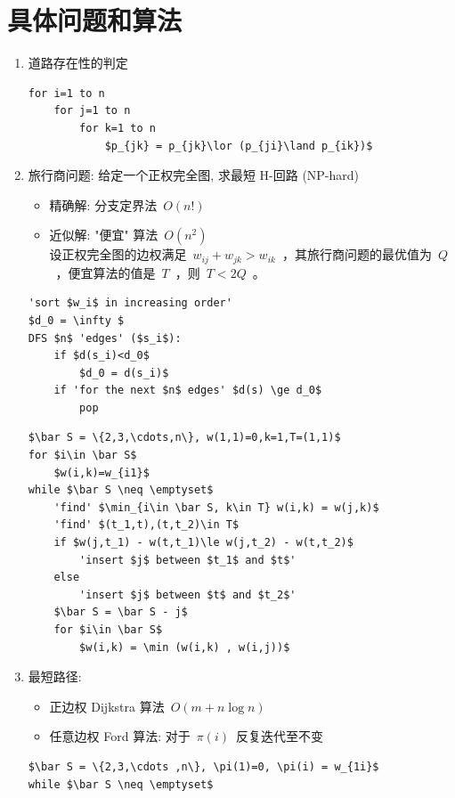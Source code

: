 \documentclass[11pt,a4paper]{article}%
\renewcommand{\[}{~$}
\renewcommand{\]}{$~}%
\begin{document}
\section{具体问题和算法}
	\begin{enumerate}
	 \item 道路存在性的判定
	 	 \begin{lstlisting}[mathescape,frame=shadowbox, caption=道路存在性的 Warshall 算法]
for i=1 to n
	for j=1 to n
		for k=1 to n
			$p_{jk} = p_{jk}\lor (p_{ji}\land p_{ik})$
	 	\end{lstlisting}
	 \item 旅行商问题: 给定一个正权完全图, 求最短 H-回路 (NP-hard)
	  \begin{itemize}
	   \item 精确解: 分支定界法\[O(n!)\]
	   \item 近似解: "便宜" 算法\[O(n^2)\]\\
	   	设正权完全图的边权满足\[w_{ij} + w_{jk}> w_{ik}\]，其旅行商问题的最优值为\[Q\]，便宜算法的值是\[T\]，则\[T<2Q\]。
	  \end{itemize}
	  \begin{lstlisting}[mathescape,frame=shadowbox, caption=旅行商问题的分支定界法]
'sort $w_i$ in increasing order'
$d_0 = \infty $
DFS $n$ 'edges' ($s_i$):
	if $d(s_i)<d_0$
		$d_0 = d(s_i)$
	if 'for the next $n$ edges' $d(s) \ge d_0$
		pop
	 	\end{lstlisting}
	   	\begin{lstlisting}[mathescape,frame=shadowbox, caption=旅行商问题的便宜算法]
$\bar S = \{2,3,\cdots,n\}, w(1,1)=0,k=1,T=(1,1)$
for $i\in \bar S$
	$w(i,k)=w_{i1}$
while $\bar S \neq \emptyset$
	'find' $\min_{i\in \bar S, k\in T} w(i,k) = w(j,k)$
	'find' $(t_1,t),(t,t_2)\in T$
	if $w(j,t_1) - w(t,t_1)\le w(j,t_2) - w(t,t_2)$
		'insert $j$ between $t_1$ and $t$'
	else
		'insert $j$ between $t$ and $t_2$'
	$\bar S = \bar S - j$
	for $i\in \bar S$
		$w(i,k) = \min (w(i,k) , w(i,j))$ 
	 	\end{lstlisting}
	 \item 最短路径: 
	 \begin{itemize}
	  \item 正边权 Dijkstra 算法\[O(m+n\log n)\]
	  \item 任意边权 Ford 算法: 对于\[\pi(i)\]反复迭代至不变
	 \end{itemize}
	 	\begin{lstlisting}[mathescape,frame=shadowbox, caption=最短路径的 Dijkstra 算法]
$\bar S = \{2,3,\cdots ,n\}, \pi(1)=0, \pi(i) = w_{1i}$
while $\bar S \neq \emptyset$

\end{lstlisting}
\end{enumerate}
\end{document}
